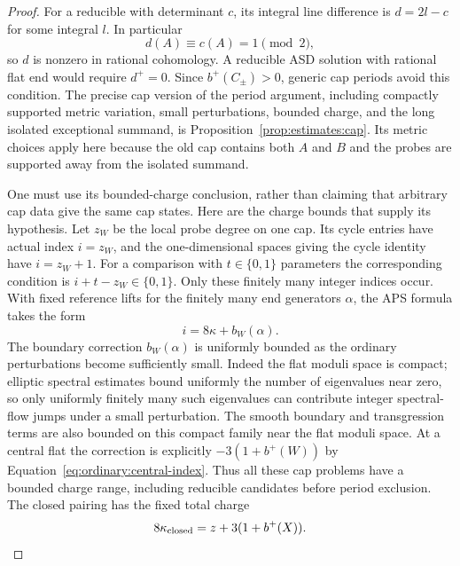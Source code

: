 \begin{proof}
For a reducible with determinant $c$, its integral line difference is
$d=2l-c$ for some integral $l$.  In particular
\[
                   d(A)\equiv c(A)=1\pmod2,
\]
so $d$ is nonzero in rational cohomology.  A reducible ASD solution with
rational flat end would require $d^+=0$.  Since $b^+(C_\pm)>0$,
generic cap periods avoid this condition.  The precise cap version of
the period argument, including compactly supported metric variation,
small perturbations, bounded charge, and the long isolated exceptional
summand, is Proposition~\ref{prop:estimates:cap}.  Its metric choices
apply here because the old cap contains both $A$ and $B$ and the probes
are supported away from the isolated summand.

One must use its bounded-charge conclusion, rather than claiming that
arbitrary cap data give the same cap states.  Here are the charge bounds
that supply its hypothesis.  Let $z_W$ be the local probe degree on one
cap.  Its cycle entries have actual index $i=z_W$, and the
one-dimensional spaces giving the cycle identity have $i=z_W+1$.
For a comparison with $t\in\{0,1\}$ parameters the corresponding
condition is $i+t-z_W\in\{0,1\}$.  Only these finitely many integer
indices occur.  With fixed reference lifts for the finitely many end
generators $\alpha$, the APS formula takes the form
\[
                       i=8\kappa+b_W(\alpha).
\]
The boundary correction $b_W(\alpha)$ is uniformly bounded as the
ordinary perturbations become sufficiently small.  Indeed the flat
moduli space is compact; elliptic spectral estimates bound uniformly
the number of eigenvalues near zero, so only uniformly finitely many
such eigenvalues can contribute integer spectral-flow jumps under a
small perturbation.  The smooth boundary and transgression terms are
also bounded on this compact family near the flat moduli space.
At a central flat the correction
is explicitly $-3(1+b^+(W))$ by
Equation~\eqref{eq:ordinary:central-index}.  Thus all these cap problems
have a bounded charge range, including reducible candidates before
period exclusion.  The closed pairing has the fixed total charge
\[
                    8\kappa_{\rm closed}
                        =z+3(1+b^+(X)).
\]


\end{proof}
